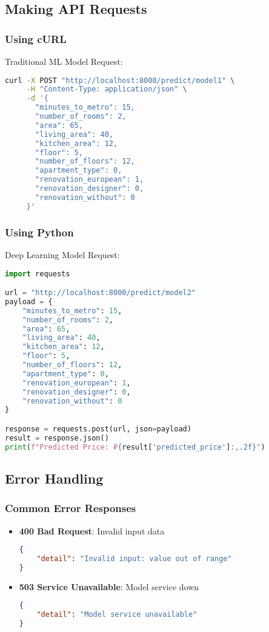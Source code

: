 \documentclass[12pt,a4paper]{report}
\begin{document}
\subsection{Making API Requests}
\subsubsection{Using cURL}
Traditional ML Model Request:
\begin{lstlisting}[language=bash]
curl -X POST "http://localhost:8000/predict/model1" \
     -H "Content-Type: application/json" \
     -d '{
       "minutes_to_metro": 15,
       "number_of_rooms": 2,
       "area": 65,
       "living_area": 40,
       "kitchen_area": 12,
       "floor": 5,
       "number_of_floors": 12,
       "apartment_type": 0,
       "renovation_european": 1,
       "renovation_designer": 0,
       "renovation_without": 0
     }'
\end{lstlisting}

\subsubsection{Using Python}
Deep Learning Model Request:
\begin{lstlisting}[language=Python]
import requests

url = "http://localhost:8000/predict/model2"
payload = {
    "minutes_to_metro": 15,
    "number_of_rooms": 2,
    "area": 65,
    "living_area": 40,
    "kitchen_area": 12,
    "floor": 5,
    "number_of_floors": 12,
    "apartment_type": 0,
    "renovation_european": 1,
    "renovation_designer": 0,
    "renovation_without": 0
}

response = requests.post(url, json=payload)
result = response.json()
print(f"Predicted Price: ₽{result['predicted_price']:,.2f}")
\end{lstlisting}

\subsection{Error Handling}
\subsubsection{Common Error Responses}
\begin{itemize}
    \item \textbf{400 Bad Request}: Invalid input data
    \begin{lstlisting}[language=json]
{
    "detail": "Invalid input: value out of range"
}
    \end{lstlisting}
    
    \item \textbf{503 Service Unavailable}: Model service down
    \begin{lstlisting}[language=json]
{
    "detail": "Model service unavailable"
}
    \end{lstlisting}
\end{itemize}
\end{document}
